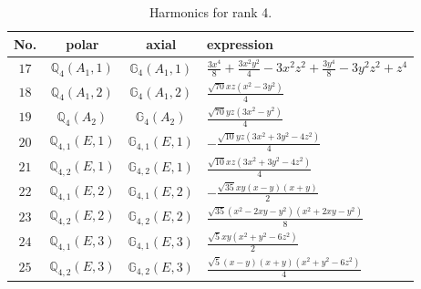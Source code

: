 \documentclass[fleqn,8pt,landscape]{jsarticle}
\begin{document}
\begin{table}[ht!]
\begin{center}
\caption{Harmonics for rank 4.}
\renewcommand{\arraystretch}{1.3}
\begin{tabular}{cccl} \hline \hline
No. & polar & axial & expression \\ \hline
$ 17 $ & $ \mathbb{Q}_{4}(A_{1},1) $ & $ \mathbb{G}_{4}(A_{1},1) $ & $ \frac{3 x^{4}}{8} + \frac{3 x^{2} y^{2}}{4} - 3 x^{2} z^{2} + \frac{3 y^{4}}{8} - 3 y^{2} z^{2} + z^{4} $ \\
$ 18 $ & $ \mathbb{Q}_{4}(A_{1},2) $ & $ \mathbb{G}_{4}(A_{1},2) $ & $ \frac{\sqrt{70} x z \left(x^{2} - 3 y^{2}\right)}{4} $ \\
$ 19 $ & $ \mathbb{Q}_{4}(A_{2}) $ & $ \mathbb{G}_{4}(A_{2}) $ & $ \frac{\sqrt{70} y z \left(3 x^{2} - y^{2}\right)}{4} $ \\
$ 20 $ & $ \mathbb{Q}_{4,1}(E,1) $ & $ \mathbb{G}_{4,1}(E,1) $ & $ - \frac{\sqrt{10} y z \left(3 x^{2} + 3 y^{2} - 4 z^{2}\right)}{4} $ \\
$ 21 $ & $ \mathbb{Q}_{4,2}(E,1) $ & $ \mathbb{G}_{4,2}(E,1) $ & $ \frac{\sqrt{10} x z \left(3 x^{2} + 3 y^{2} - 4 z^{2}\right)}{4} $ \\
$ 22 $ & $ \mathbb{Q}_{4,1}(E,2) $ & $ \mathbb{G}_{4,1}(E,2) $ & $ - \frac{\sqrt{35} x y \left(x - y\right) \left(x + y\right)}{2} $ \\
$ 23 $ & $ \mathbb{Q}_{4,2}(E,2) $ & $ \mathbb{G}_{4,2}(E,2) $ & $ \frac{\sqrt{35} \left(x^{2} - 2 x y - y^{2}\right) \left(x^{2} + 2 x y - y^{2}\right)}{8} $ \\
$ 24 $ & $ \mathbb{Q}_{4,1}(E,3) $ & $ \mathbb{G}_{4,1}(E,3) $ & $ \frac{\sqrt{5} x y \left(x^{2} + y^{2} - 6 z^{2}\right)}{2} $ \\
$ 25 $ & $ \mathbb{Q}_{4,2}(E,3) $ & $ \mathbb{G}_{4,2}(E,3) $ & $ \frac{\sqrt{5} \left(x - y\right) \left(x + y\right) \left(x^{2} + y^{2} - 6 z^{2}\right)}{4} $ \\
 \hline \hline
\end{tabular}
\end{center}
\end{table}
\end{document}
